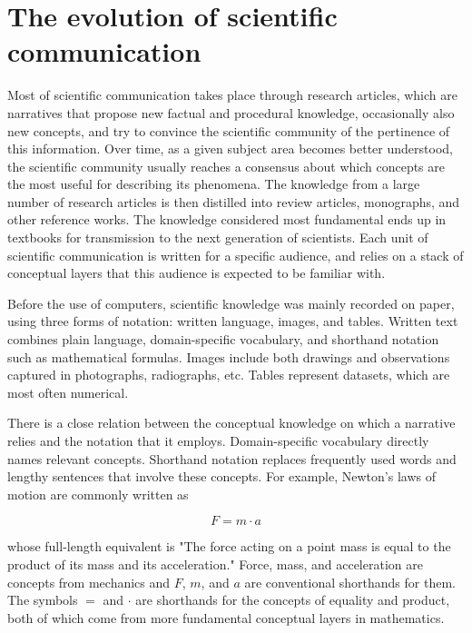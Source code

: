 \section{The evolution of scientific communication}
\label{evolution}

Most of scientific communication takes place through research articles, which are narratives that propose new factual and procedural knowledge, occasionally also new concepts, and try to convince the scientific community of the pertinence of this information. Over time, as a given subject area becomes better understood, the scientific community usually reaches a consensus about which concepts are the most useful for describing its phenomena. The knowledge from a large number of research articles is then distilled into review articles, monographs, and other reference works. The knowledge considered most fundamental ends up in textbooks for transmission to the next generation of scientists. Each unit of scientific communication is written for a specific audience, and relies on a stack of conceptual layers that this audience is expected to be familiar with.

Before the use of computers, scientific knowledge was mainly recorded on paper, using three forms of notation: written language, images, and tables. Written text combines plain language, domain-specific vocabulary, and shorthand notation such as mathematical formulas. Images include both drawings and observations captured in photographs, radiographs, etc. Tables represent datasets, which are most often numerical.

There is a close relation between the conceptual knowledge on which a narrative relies and the notation that it employs. Domain-specific vocabulary directly names relevant concepts. Shorthand notation replaces frequently used words and lengthy sentences that involve these concepts. For example, Newton's laws of motion are commonly written as

\[
   F = m \cdot a
\]

whose full-length equivalent is "The force acting on a point mass is equal to the product of its mass and its acceleration." Force, mass, and acceleration are concepts from mechanics and $F$, $m$, and $a$ are conventional shorthands for them. The symbols $=$ and $\cdot$ are shorthands for the concepts of equality and product, both of which come from more fundamental conceptual layers in mathematics.

